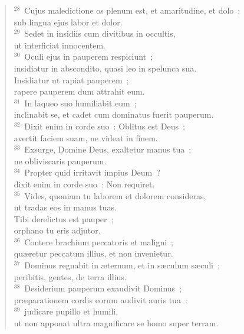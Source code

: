 \begin{flushleft}
\begin{verse}
${}^{28}$~Cujus maledictione os plenum est, et amaritudine, et dolo~;\\ sub lingua ejus labor et dolor.\\
${}^{29}$~Sedet in insidiis cum divitibus in occultis,\\ ut interficiat innocentem.\\
${}^{30}$~Oculi ejus in pauperem respiciunt~;\\ insidiatur in abscondito, quasi leo in spelunca sua.\\ Insidiatur ut rapiat pauperem~;\\ rapere pauperem dum attrahit eum.\\
${}^{31}$~In laqueo suo humiliabit eum~;\\ inclinabit se, et cadet cum dominatus fuerit pauperum.\\
${}^{32}$~Dixit enim in corde suo~: Oblitus est Deus~;\\ avertit faciem suam, ne videat in finem.\\
${}^{33}$~Exsurge, Domine Deus, exaltetur manus tua~;\\ ne obliviscaris pauperum.\\
${}^{34}$~Propter quid irritavit impius Deum~?\\ dixit enim in corde suo~: Non requiret.\\
${}^{35}$~Vides, quoniam tu laborem et dolorem consideras,\\ ut tradas eos in manus tuas.\\ Tibi derelictus est pauper~;\\ orphano tu eris adjutor.\\
${}^{36}$~Contere brachium peccatoris et maligni~;\\ qu\ae retur peccatum illius, et non invenietur.\\
${}^{37}$~Dominus regnabit in \ae ternum, et in s\ae culum s\ae culi~;\\ peribitis, gentes, de terra illius.\\
${}^{38}$~Desiderium pauperum exaudivit Dominus~;\\ pr\ae parationem cordis eorum audivit auris tua~:\\
${}^{39}$~judicare pupillo et humili,\\ ut non apponat ultra magnificare se homo super terram.\end{verse}\end{flushleft}


